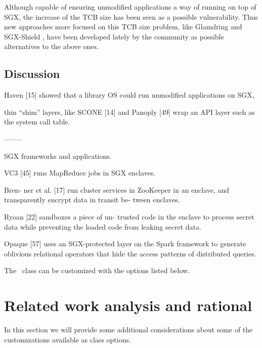 Although capable of ensuring unmodified applications a way of running on top of SGX, the increase of the TCB size has been seen as a possible vulnerability. 
Thus new approaches more focused on this TCB size problem, like Glamdring \cite{glamdringPaper} and SGX-Shield \cite{sgxShieldPaper}, have been developed lately by the community as possible alternatives to the above ones.




\subsection{Discussion}
\label{ssec:sgx_frameworks_discussion}

Haven [15] showed
that a library OS could run unmodified applications on
SGX,

thin “shim” layers, like SCONE [14] and Panoply [49] wrap 
an API layer such as the system call table.


--------


SGX frameworks and applications.

VC3 [45]
runs MapReduce jobs in SGX enclaves.

Bren-
ner et al. [17] run cluster services in ZooKeeper in an
enclave, and transparently encrypt data in transit be-
tween enclaves.

Ryoan [22] sandboxes a piece of un-
trusted code in the enclave to process secret data while
preventing the loaded code from leaking secret data.

Opaque [57] uses an SGX-protected layer on the Spark
framework to generate oblivious relational operators that
hide the access patterns of distributed queries.

The \novathesis\ class can be customized with the options listed below.



\section{Related work analysis and rational} %
\label{sec:relatedwork_analysis}

In this section we will provide some additional considerations about some of the customizations available as class options.



